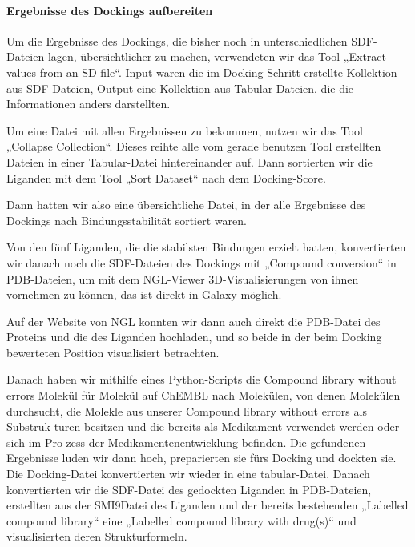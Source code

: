 \documentclass[11pt]{article}
\begin{document}
    \paragraph{Ergebnisse des Dockings aufbereiten}
    Um die Ergebnisse des Dockings, die bisher noch in unterschiedlichen SDF-Dateien lagen, übersichtlicher zu machen, verwendeten wir das Tool „Extract values from an SD-file“.
    Input waren die im Docking-Schritt erstellte Kollektion aus SDF-Dateien, Output eine Kollektion aus Tabular-Dateien, die die Informationen anders darstellten.

    Um eine Datei mit allen Ergebnissen zu bekommen, nutzen wir das Tool „Collapse Collection“.
    Dieses reihte alle vom gerade benutzen Tool erstellten Dateien in einer Tabular-Datei hintereinander auf.
    Dann sortierten wir die Liganden mit dem Tool „Sort Dataset“ nach dem Docking-Score.

    Dann hatten wir also eine übersichtliche Datei, in der alle Ergebnisse des Dockings nach Bindungsstabilität sortiert waren.

    Von den fünf Liganden, die die stabilsten Bindungen erzielt hatten, konvertierten wir danach noch die SDF-Dateien des Dockings mit „Compound conversion“ in PDB-Dateien, um mit dem NGL-Viewer 3D-Visualisierungen von ihnen vornehmen zu können, das ist direkt in Galaxy möglich.

    Auf der Website von NGL konnten wir dann auch direkt die PDB-Datei des Proteins und die des Liganden hochladen, und so beide in der beim Docking bewerteten Position visualisiert betrachten.

    Danach haben wir mithilfe eines Python-Scripts die Compound library without errors Molekül für Molekül auf ChEMBL nach Molekülen, von denen Molekülen durchsucht, die Molekle aus unserer Compound library without errors als Substruk-turen besitzen und die bereits als Medikament verwendet werden oder sich im Pro-zess der Medikamentenentwicklung befinden.
    Die gefundenen Ergebnisse luden wir dann hoch, preparierten sie fürs Docking und dockten sie.
    Die Docking-Datei konvertierten wir wieder in eine tabular-Datei.
    Danach konvertierten wir die SDF-Datei des gedockten Liganden in PDB-Dateien, erstellten aus der SMI9Datei des Liganden und der bereits bestehenden „Labelled compound library“ eine „Labelled compound library with drug(s)“ und visualisierten deren Strukturformeln.


\end{document}
